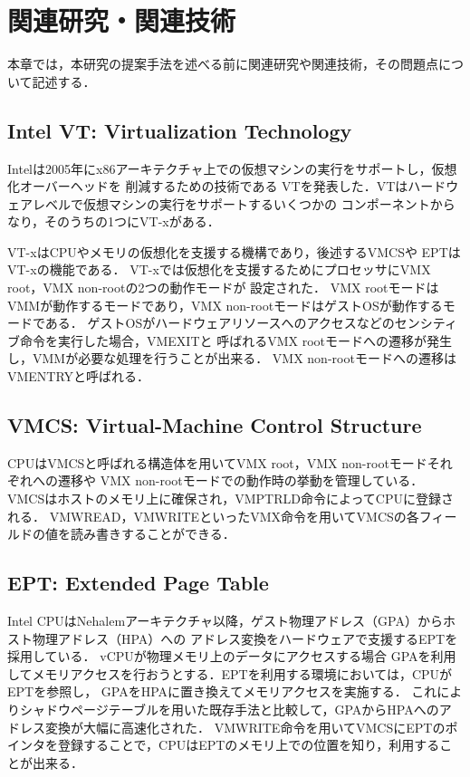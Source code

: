\chapter{関連研究・関連技術}
\label{chap:related_works}

本章では，本研究の提案手法を述べる前に関連研究や関連技術，その問題点について記述する．

\section{Intel VT: Virtualization Technology}
\label{sec:vt}

Intelは2005年にx86アーキテクチャ上での仮想マシンの実行をサポートし，仮想化オーバーヘッドを
削減するための技術である
VTを発表した\cite{intelsdm}．VTはハードウェアレベルで仮想マシンの実行をサポートするいくつかの
コンポーネントからなり，そのうちの1つにVT-xがある．

VT-xはCPUやメモリの仮想化を支援する機構であり，後述するVMCSや
EPTはVT-xの機能である．
VT-xでは仮想化を支援するためにプロセッサにVMX root，VMX non-rootの2つの動作モードが
設定された．
VMX rootモードはVMMが動作するモードであり，VMX non-rootモードはゲストOSが動作するモードである．
ゲストOSがハードウェアリソースへのアクセスなどのセンシティブ命令を実行した場合，VMEXITと
呼ばれるVMX rootモードへの遷移が発生し，VMMが必要な処理を行うことが出来る．
VMX non-rootモードへの遷移はVMENTRYと呼ばれる．

\section{VMCS: Virtual-Machine Control Structure}
\label{sec:vmcs}

CPUはVMCSと呼ばれる構造体を用いてVMX root，VMX non-rootモードそれぞれへの遷移や
VMX non-rootモードでの動作時の挙動を管理している\cite{intelsdm}．
VMCSはホストのメモリ上に確保され，VMPTRLD命令によってCPUに登録される．
VMWREAD，VMWRITEといったVMX命令を用いてVMCSの各フィールドの値を読み書きすることができる．

\section{EPT: Extended Page Table}
\label{sec:ept}

Intel CPUはNehalemアーキテクチャ以降，ゲスト物理アドレス（GPA）からホスト物理アドレス（HPA）への
アドレス変換をハードウェアで支援するEPTを採用している\cite{nehalem}．
vCPUが物理メモリ上のデータにアクセスする場合
GPAを利用してメモリアクセスを行おうとする．EPTを利用する環境においては，CPUがEPTを参照し，
GPAをHPAに置き換えてメモリアクセスを実施する．
これによりシャドウページテーブルを用いた既存手法と比較して，GPAからHPAへのアドレス変換が大幅に高速化された．
VMWRITE命令を用いてVMCSにEPTのポインタを登録することで，CPUはEPTのメモリ上での位置を知り，利用することが出来る．

